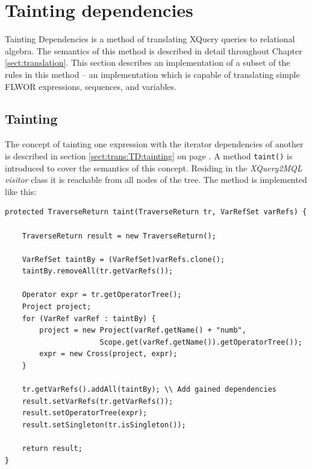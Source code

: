 \section{Tainting dependencies}
\label{sect:impl:tainting_deps}
Tainting Dependencies is a method of translating XQuery queries to
relational algebra. The semantics of this method is described in detail
throughout Chapter \ref{sect:translation}. This section
describes an implementation of a subset of the rules in this method -- an
implementation which is capable of translating simple FLWOR expressions,
sequences, and variables.

\subsection{Tainting}
\label{sect:impl:taint:taint}
The concept of tainting one expression with the iterator dependencies of another is described in section
\ref{sect:trans:TD:tainting} on page \pageref{sect:trans:TD:tainting}. A method
\texttt{taint()} is introduced to cover the semantics of this concept.
Residing in the \textit{XQuery2MQL visitor} class it is reachable from all nodes of the tree. The method is implemented like this:

\begin{Verbatim}
protected TraverseReturn taint(TraverseReturn tr, VarRefSet varRefs) {
        
    TraverseReturn result = new TraverseReturn();
        
    VarRefSet taintBy = (VarRefSet)varRefs.clone();
    taintBy.removeAll(tr.getVarRefs());
        
    Operator expr = tr.getOperatorTree();
    Project project;
    for (VarRef varRef : taintBy) {
        project = new Project(varRef.getName() + "numb",
                      Scope.get(varRef.getName()).getOperatorTree());
        expr = new Cross(project, expr);
    }

    tr.getVarRefs().addAll(taintBy); \\ Add gained dependencies
    result.setVarRefs(tr.getVarRefs());
    result.setOperatorTree(expr);
    result.setSingleton(tr.isSingleton());
        
    return result;
}
\end{Verbatim}

